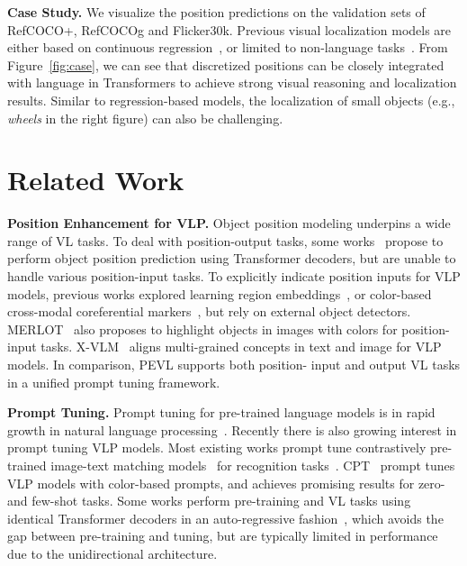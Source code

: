 \documentclass[11pt]{article}
\begin{document}
\smallskip
\textbf{Case Study.} We visualize the position predictions on the validation sets of RefCOCO+, RefCOCOg and Flicker30k. Previous visual localization models are either based on continuous regression~\cite{kamath2021mdetr}, or limited to non-language tasks~\cite{chen2021pix2seq}. From Figure~\ref{fig:case}, we can see that discretized positions can be closely integrated with language in Transformers to achieve strong visual reasoning and localization results. Similar to regression-based models, the localization of small objects (e.g., \textit{wheels} in the right figure) can also be challenging.




\section{Related Work}



\smallskip
\textbf{Position Enhancement for VLP.} Object position modeling underpins a wide range of VL tasks. To deal with position-output tasks, some works~\cite{kamath2021mdetr,DBLP:journals/corr/abs-2104-00743,yang2021crossing} propose to perform object position prediction using Transformer decoders, but are unable to handle various position-input tasks. To explicitly indicate position inputs for VLP models, previous works explored learning region embeddings~\cite{DBLP:conf/icml/ChoLTB21}, or color-based cross-modal coreferential markers~\cite{yao2021cpt}, but rely on external object detectors. MERLOT~\cite{zellers2021merlot} also proposes to highlight objects in images with colors for position-input tasks. X-VLM~\cite{zeng2021multi} aligns multi-grained concepts in text and image for VLP models. In comparison, PEVL supports both position- input and output VL tasks in a unified prompt tuning framework.

\smallskip
\textbf{Prompt Tuning.} Prompt tuning for pre-trained language models is in rapid growth in natural language processing~\cite{petroni2019language,raffel2019exploring,brown2020language,schick-schutze-2021-just,gao2021making,qin2021learning,liu2021pre,yao2022prompt}. Recently there is also growing interest in prompt tuning VLP models. Most existing works prompt tune contrastively pre-trained image-text matching models~\cite{radford2021learning,DBLP:conf/icml/JiaYXCPPLSLD21} for recognition tasks~\cite{zhou2021learning,rao2021denseclip,wang2021actionclip,gu2021zero,xie2021zsd,ju2021prompting}. CPT~\cite{yao2021cpt} prompt tunes VLP models with color-based prompts, and achieves promising results for zero- and few-shot tasks. Some works perform pre-training and VL tasks using identical Transformer decoders in an auto-regressive fashion~\cite{DBLP:journals/corr/abs-2108-10904,DBLP:conf/icml/ChoLTB21,yang2021crossing,tsimpoukelli2021multimodal}, which avoids the gap between pre-training and tuning, but are typically limited in performance due to the unidirectional architecture.
\end{document}
